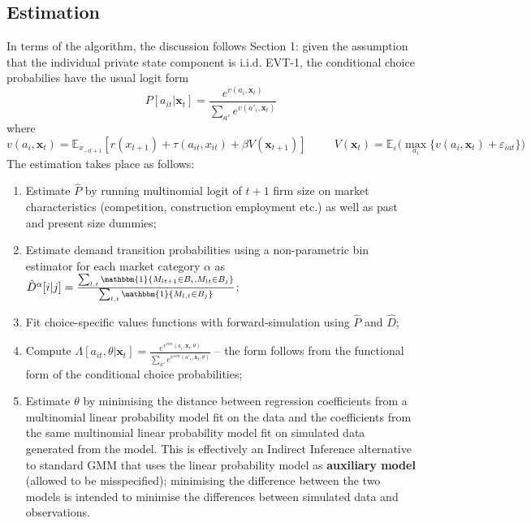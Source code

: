 \documentclass[11pt]{article}
\begin{document}
\subsection*{Estimation}

In terms of the algorithm, the discussion follows Section 1: given the assumption that the individual private state component is i.i.d. EVT-1, the conditional choice probabilies have the usual logit form
\begin{equation*}
	P[a_{it}|\mathbf{x}_t] = \frac{e^{v(a_i,\mathbf{x}_t)}}{\sum_{a'}e^{v(a'_i,\mathbf{x}_t)}}
\end{equation*}
where
\begin{equation*}
	v(a_i,\mathbf{x}_t) = \mathbb{E}_{x_{-it+1}}[r(x_{t+1}) + \tau(a_{it},x_{it}) + \beta V(\mathbf{x}_{t+1})] ~~~~~~~~~~~
	V(\mathbf{x}_t) = \mathbb{E}_{\varepsilon} \bigg(\max_{a_i}\{ v(a_i,\mathbf{x}_t) + \varepsilon_{iat}\} \bigg)
\end{equation*}
The estimation takes place as follows:
\begin{enumerate}
	\item Estimate $\hat{P}$ by running multinomial logit of $t+1$ firm size on market characteristics (competition, construction employment etc.) as well as past and present size dummies;
	\item Estimate demand transition probabilities using a non-parametric bin estimator for each market category $\alpha$ as $\hat{D}^\alpha[i|j] = \frac{\sum_{l, t}\mathbbm{1}\{M_{l t + 1} \in B_i, M_{lt} \in B_j\}}{\sum_{l,t}\mathbbm{1}\{M_{l,t} \in B_j\}}$;
	\item Fit choice-specific values functions with forward-simulation using $\hat{P}$ and $\hat{D}$;
	\item Compute $\Lambda[a_{it}, \theta | \mathbf{x}_t] = \frac{e^{v^{sim}(a_i,\mathbf{x}_t, \theta)}}{\sum_{a'}e^{v^{sim}(a'_i,\mathbf{x}_t, \theta)}}$ -- the form follows from the functional form of the conditional choice probabilities;
	\item Estimate $\theta$ by minimising the distance between regression coefficients from a multinomial linear probability model fit on the data and the coefficients from the same multinomial linear probability model fit on simulated data generated from the model.
	This is effectively an Indirect Inference alternative to standard GMM that uses the linear probability model as \textbf{auxiliary model} (allowed to be misspecified); minimising the difference between the two models is intended to minimise the differences between simulated data and observations.
\end{enumerate}
\end{document}
